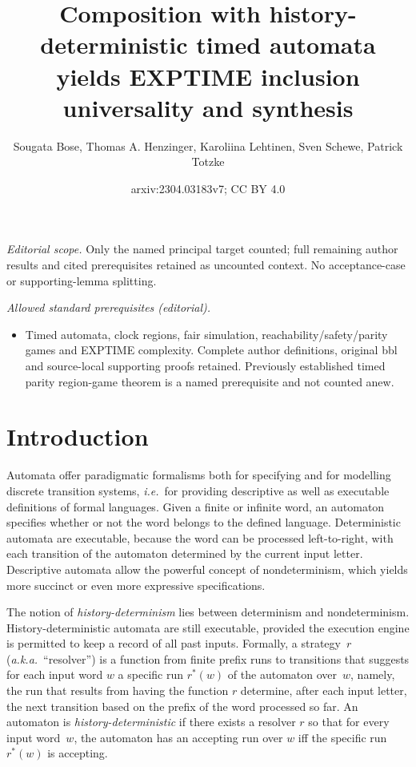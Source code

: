 \documentclass[10pt,a4paper]{amsart}
\title{Composition with history-deterministic timed automata yields EXPTIME inclusion universality and synthesis}
\author{Sougata Bose, Thomas A. Henzinger, Karoliina Lehtinen, Sven Schewe, Patrick Totzke}
\date{arxiv:2304.03183v7; CC BY 4.0}
\theoremstyle{definition}
\numberwithin{equation}{section}
\begin{document}
\maketitle
\noindent\textit{Editorial scope.} Only the named principal target counted; full remaining author results and cited prerequisites retained as uncounted context. No acceptance-case or supporting-lemma splitting.\par\medskip
\noindent\textit{Allowed standard prerequisites (editorial).}\begin{itemize}
\item Timed automata, clock regions, fair simulation, reachability/safety/parity games and EXPTIME complexity. Complete author definitions, original bbl and source-local supporting proofs retained. Previously established timed parity region-game theorem is a named prerequisite and not counted anew.
\end{itemize}\medskip
	\section{Introduction}
	\label{sec:intro}


Automata offer paradigmatic formalisms both for specifying and for modelling
discrete transition systems,
\emph{i.e.}~for providing descriptive as well as executable definitions of
formal languages.
Given a finite or infinite word, an automaton specifies whether or not the
word belongs to the defined language.
Deterministic automata are executable, because the word can be processed
left-to-right, with each transition of the automaton determined by
the current input letter.
Descriptive automata allow the powerful concept of nondeterminism, which
yields more succinct or even more expressive specifications.

The notion of \emph{history-determinism} lies between determinism and
nondeterminism.
History-deterministic automata are still executable, provided the execution
engine is permitted to keep a record of all past inputs. 
Formally, a strategy~$r$ (\emph{a.k.a.}~``resolver'') is a function from
finite prefix runs to transitions that suggests for each input word $w$
a specific run $r^*(w)$ of the automaton over~$w$,
namely, the run that results from having the function $r$ determine, after
each input letter, the next transition based on the prefix of the word
processed so far.
An automaton is \emph{history-deterministic} if there exists a resolver $r$
so that for every input word~$w$, the automaton has an accepting run over
$w$ iff the specific run $r^*(w)$ is accepting.
\end{document}
